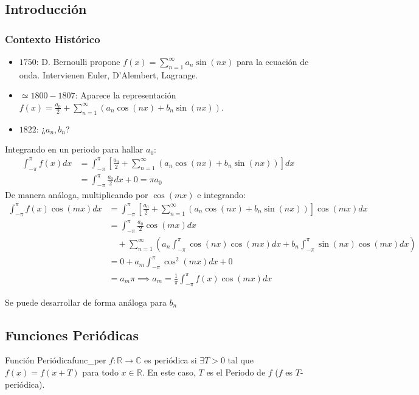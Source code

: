 
\subsection{Introducción}

\subsubsection{Contexto Histórico}
\begin{itemize}
    \item $1750$: D. Bernoulli propone $f(x) = \sum_{n=1}^{\infty} a_n \sin(nx)$ para la ecuación de onda. Intervienen Euler, D'Alembert, Lagrange.
    \item $\simeq 1800 - 1807$: Aparece la representación $f(x) = \frac{a_0}{2} + \sum_{n=1}^{\infty} (a_n \cos(nx) + b_n \sin(nx))$.
    \item $1822$: ¿$a_n, b_n$?
\end{itemize}
Integrando en un periodo para hallar $a_0$:
\begin{align*}
    \int_{-\pi}^{\pi} f(x) dx &= \int_{-\pi}^{\pi} \left[ \frac{a_0}{2} + \sum_{n=1}^{\infty} (a_n \cos(nx) + b_n \sin(nx)) \right] dx \\
    &= \int_{-\pi}^{\pi} \frac{a_0}{2} dx + 0 = \pi a_0
\end{align*}
De manera análoga, multiplicando por $\cos(mx)$ e integrando:
\begin{align*}
    \int_{-\pi}^{\pi} f(x) \cos(mx) dx &= \int_{-\pi}^{\pi} \left[ \frac{a_0}{2} + \sum_{n=1}^{\infty} (a_n \cos(nx) + b_n \sin(nx)) \right] \cos(mx) dx \\
    &= \int_{-\pi}^{\pi} \frac{a_0}{2} \cos(mx) dx \\
    &\quad + \sum_{n=1}^{\infty} \left( a_n \int_{-\pi}^{\pi} \cos(nx) \cos(mx) dx + b_n \int_{-\pi}^{\pi} \sin(nx) \cos(mx) dx \right) \\
    &= 0 + a_m \int_{-\pi}^{\pi} \cos^2(mx) dx + 0 \\
    &= a_m \pi \implies a_m = \frac{1}{\pi} \int_{-\pi}^{\pi} f(x) \cos(mx) dx
\end{align*}

Se puede desarrollar de forma análoga para $b_n$
\subsection{Funciones Periódicas}

\begin{definicion}{Función Periódica}{func_per}
$f: \mathbb{R} \to \mathbb{C}$ es periódica si $\exists T > 0$ tal que $f(x) = f(x+T)$ para todo $x \in \mathbb{R}$. En este caso, $T$ es el Periodo de $f$ ($f$ es $T$-periódica).
\end{definicion}

